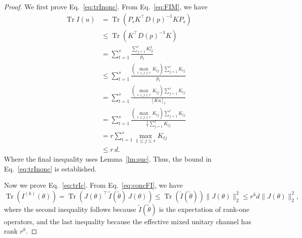 \documentclass[12pt]{article}
\begin{document}
\begin{proof}
We first prove Eq.~\ref{eq:trInonc}. From Eq.~\ref{eq:FIM}, we have
\begin{equation}
\begin{split}
    \operatorname{Tr}I(u)
    &= \operatorname{Tr}(P_s K^\top D(p)^{-1} K P_s) \\
    &\le \operatorname{Tr}(K^\top D(p)^{-1} K) \\
    &= \sum_{t=1}^{s}\frac{\sum_{j=1}^{r} K_{tj}^{2}}{p_t} \\
    &\le \sum_{t=1}^{s}\frac{(\max_{1\le j\le r} K_{tj})\sum_{j=1}^{r} K_{tj}}{p_t} \\
    &= \sum_{t=1}^{s}\frac{(\max_{1\le j\le r} K_{tj})\sum_{j=1}^{r} K_{tj}}{[Ku]_t} \\
    &= \sum_{t=1}^{s}\frac{(\max_{1\le j\le r} K_{tj})\sum_{j=1}^{r} K_{tj}}{\frac{1}{r}\sum_{j=1}^{r} K_{tj}} \\
    &= r\sum_{t=1}^{s}\max_{1\le j\le r} K_{tj}\\
    &\le r\,d.
\end{split}
\end{equation}
Where the final inequality uses Lemma~\ref{lm:suc}. Thus, the bound in Eq.~\ref{eq:trInonc} is established.

Now we prove Eq.~\ref{eq:trIc}. From Eq.~\ref{eq:concFI}, we have
\begin{equation}\label{eq:trIJconc}
    \operatorname{Tr}(I^{(k)}(\theta)) 
    = \operatorname{Tr}(J(\theta)^{\top} \, \tilde{I}(\tilde{\theta}) \, J(\theta)) 
    \le \operatorname{Tr}(\tilde{I}(\tilde{\theta})) \| J(\theta) \|_2^2 
    \le r^k d  \| J(\theta) \|_2^2,
\end{equation}
where the second inequality follows because $\tilde{I}(\tilde{\theta})$ is the expectation of rank-one operators, and the last inequality because the effective mixed unitary channel has rank $r^k$.


\end{proof}
\end{document}
